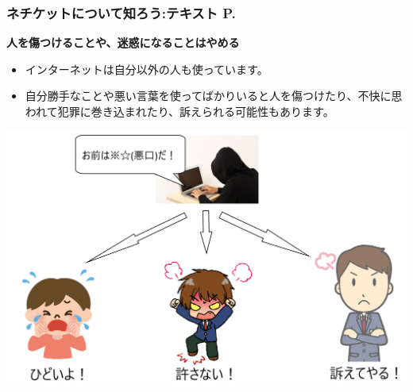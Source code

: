 \documentclass[dvipdfmx]{beamer}
\begin{document}
\begin{frame}[fragile]
	\frametitle{ネチケットについて知ろう:テキスト P.\pageref{1:P:Netiquette}~~~}
    \large\textbf{人を傷つけることや、迷惑になることはやめる}
            \begin{itemize}
                \item インターネットは自分以外の人も使っています。
                \item 自分勝手なことや悪い言葉を使ってばかりいると人を傷つけたり、不快に思われて犯罪に巻き込まれたり、訴えられる可能性もあります。
            \end{itemize}
            \vfill
            
			\begin{minipage}{0.7\textwidth}
                {\upshape
                  \includegraphics[width=\textwidth]{slide07-img004.png}}
            \end{minipage}
\end{frame}
\end{document}
